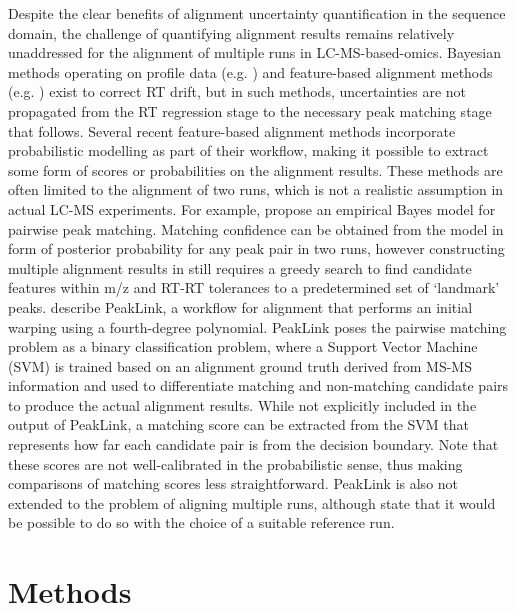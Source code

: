 Despite the clear benefits of alignment uncertainty quantification in the sequence domain, the challenge of quantifying alignment results remains relatively unaddressed for the alignment of multiple runs in LC-MS-based-omics. Bayesian methods operating on profile data (e.g. \cite{Listgarten2004, Kong2009, Tsai2013a}) and feature-based alignment methods (e.g. \cite{Fischer2006, Pluskal2010, Voss2011a}) exist to correct RT drift, but in such methods, uncertainties are not propagated from the RT regression stage to the necessary peak matching stage that follows. Several recent feature-based alignment methods incorporate probabilistic modelling as part of their workflow, making it possible to extract some form of scores or probabilities on the alignment results. These methods are often limited to the alignment of two runs, which is not a realistic assumption in actual LC-MS experiments. For example, \cite{Jeong2012} propose an empirical Bayes model for pairwise peak matching. Matching confidence can be obtained from the model in form of posterior probability for any peak pair in two runs, however constructing multiple alignment results in \cite{Jeong2012} still requires a greedy search to find candidate features within m/z and RT-RT tolerances to a predetermined set of `landmark' peaks. \cite{GhanatBari2014b} describe PeakLink, a workflow for alignment that performs an initial warping using a fourth-degree polynomial. PeakLink poses the pairwise matching problem as a binary classification problem, where a Support Vector Machine (SVM) is trained based on an alignment ground truth derived from MS-MS information and used to differentiate matching and non-matching candidate pairs to produce the actual alignment results. While not explicitly included in the output of PeakLink, a matching score can be extracted from the SVM that represents how far each candidate pair is from the decision boundary. Note that these scores are not well-calibrated in the probabilistic sense, thus making comparisons of matching scores less straightforward. PeakLink is also not extended to the problem of aligning multiple runs, although \cite{GhanatBari2014b} state that it would be possible to do so with the choice of a suitable reference run.

\section{Methods}

